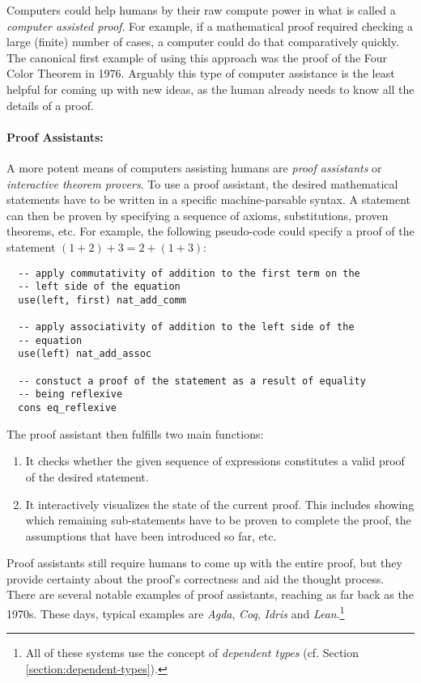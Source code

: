 Computers could help humans by their raw compute power in what is called a \emph{computer assisted proof}.
For example, if a mathematical proof required checking a large (finite) number of cases, a computer could do that comparatively quickly.
The canonical first example of using this approach was the proof of the Four Color Theorem in 1976.
Arguably this type of computer assistance is the least helpful for coming up with new ideas, as the human already needs to know all the details of a proof.

\paragraph{Proof Assistants:}

A more potent means of computers assisting humans are \emph{proof assistants} or \emph{interactive theorem provers}.
To use a proof assistant, the desired mathematical statements have to be written in a specific machine-parsable syntax.
A statement can then be proven by specifying a sequence of axioms, substitutions, proven theorems, etc. 
For example, the following pseudo-code could specify a proof of the statement $(1 + 2) + 3 = 2 + (1 + 3)$:

\begin{lstlisting}
  -- apply commutativity of addition to the first term on the 
  -- left side of the equation
  use(left, first) nat_add_comm 
  
  -- apply associativity of addition to the left side of the
  -- equation
  use(left) nat_add_assoc
  
  -- constuct a proof of the statement as a result of equality
  -- being reflexive
  cons eq_reflexive 
\end{lstlisting}

\noindent The proof assistant then fulfills two main functions:

\begin{enumerate}
  \item It checks whether the given sequence of expressions constitutes a valid proof of the desired statement.
  \item It interactively visualizes the state of the current proof.
  This includes showing which remaining sub-statements have to be proven to complete the proof, the assumptions that have been introduced so far, etc.
\end{enumerate}

\noindent Proof assistants still require humans to come up with the entire proof, but they provide certainty about the proof's correctness and aid the thought process.
There are several notable examples of proof assistants, reaching as far back as the 1970s. 
These days, typical examples are \emph{Agda}, \emph{Coq}, \emph{Idris} and \emph{Lean}.\footnote{All of these systems use the concept of \emph{dependent types} (cf. Section \ref{section:dependent-types}).}

